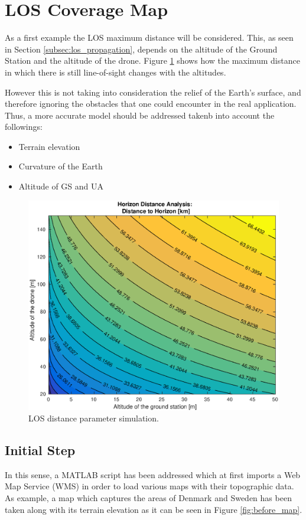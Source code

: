 \section{LOS Coverage Map}\label{sec:los_map}
As a first example the LOS maximum distance will be considered. This, as seen in Section \ref{subsec:los_propagation}, depends on the altitude of the Ground Station and the altitude of the drone. Figure \ref{fig:altitude2distance} shows how the maximum distance in which there is still line-of-sight changes with the altitudes.

However this is not taking into consideration the relief of the Earth's surface, and therefore ignoring the obstacles that one could encounter in the real application. Thus, a more accurate model should be addressed takenb into account the followings:

\begin{itemize}
  \item Terrain elevation
  \item Curvature of the Earth
  \item Altitude of GS and UA
\end{itemize}

\begin{figure}[H]
  \centering
  \includegraphics[scale=0.65]{figures/altitude2distance.eps}
  \caption{LOS distance parameter simulation.}
    \label{fig:altitude2distance}
\end{figure}

\subsection{Initial Step}
In this sense, a MATLAB script has been addressed which at first imports a Web Map Service (WMS) in order to load various maps with their topographic data. As example, a map which captures the areas of Denmark and Sweden has been taken along with its terrain elevation as it can be seen in Figure \ref{fig:before_map}.

